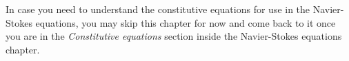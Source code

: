 In case you need to understand the constitutive equations for use in the Navier-Stokes equations, you may skip this chapter for now and come back to it once you are in the \textit{Constitutive equations} section inside the Navier-Stokes equations chapter.